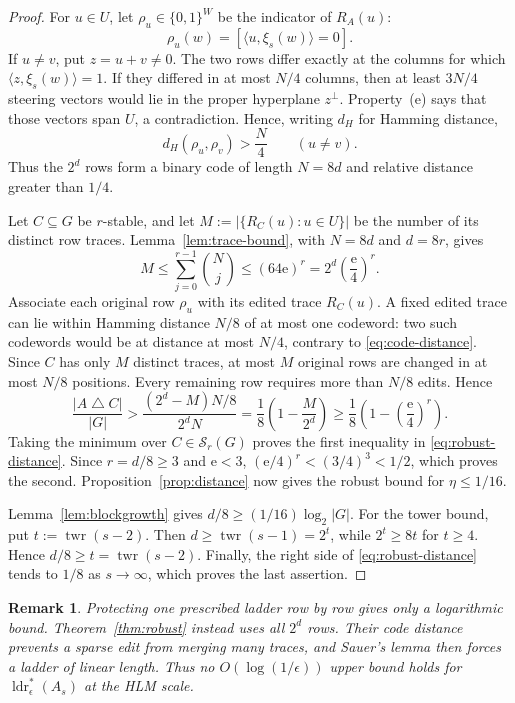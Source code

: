 \documentclass[10pt,a4paper]{amsart}
\newtheorem{remark}[theorem]{Remark}
\numberwithin{theorem}{section}
\newcommand{\inner}[2]{\langle #1,#2\rangle}
\newcommand{\abs}[1]{\lvert #1\rvert}
\newcommand{\twr}{\operatorname{twr}}
\newcommand{\ldrs}{\operatorname{ldr}^{*}}
\newcommand{\Stable}{\mathcal{S}}
\newcommand{\econst}{\mathrm e}
\begin{document}
\begin{proof}
For $u\in U$, let $\rho_u\in\{0,1\}^{W}$ be the indicator of $R_A(u)$:
\[
  \rho_u(w)=[\inner{u}{\xi_s(w)}=0].
\]
If $u\ne v$, put $z=u+v\ne0$.  The two rows differ exactly at the columns
for which $\inner{z}{\xi_s(w)}=1$.  If they differed in at most $N/4$
columns, then at least $3N/4$ steering vectors would lie in the proper
hyperplane $z^\perp$.  Property~\textup{(e)} says that those vectors span
$U$, a contradiction.  Hence, writing $d_H$ for Hamming distance,
\begin{equation}\label{eq:code-distance}
  d_H(\rho_u,\rho_v)>\frac N4\qquad(u\ne v).
\end{equation}
Thus the $2^d$ rows form a binary code of length $N=8d$ and relative
distance greater than $1/4$.

Let $C\subseteq G$ be $r$-stable, and let
$M:=\abs{\{R_C(u):u\in U\}}$ be the number of its distinct row traces.
Lemma~\ref{lem:trace-bound}, with $N=8d$ and $d=8r$, gives
\begin{equation}\label{eq:stable-traces}
  M\le\sum_{j=0}^{r-1}\binom Nj
  \le(64\econst)^r
  =2^d\left(\frac{\econst}{4}\right)^r.
\end{equation}
Associate each original row $\rho_u$ with its edited trace $R_C(u)$.  A fixed
edited trace can lie within Hamming distance $N/8$ of at most one codeword:
two such codewords would be at distance at most $N/4$, contrary to
\eqref{eq:code-distance}.  Since $C$ has only $M$ distinct traces, at most
$M$ original rows are changed in at most $N/8$ positions.  Every remaining
row requires more than $N/8$ edits.  Hence
\[
  \frac{\abs{A\mathbin\triangle C}}{\abs G}
  >\frac{(2^d-M)N/8}{2^dN}
  =\frac18\left(1-\frac{M}{2^d}\right)
  \ge\frac18\left(1-\left(\frac{\econst}{4}\right)^r\right).
\]
Taking the minimum over $C\in\Stable_r(G)$ proves the first inequality in
\eqref{eq:robust-distance}.  Since $r=d/8\ge3$ and $\econst<3$,
$(\econst/4)^r<(3/4)^3<1/2$, which proves the second.
Proposition~\ref{prop:distance} now gives the robust bound for
$\eta\le1/16$.

Lemma~\ref{lem:blockgrowth} gives
$d/8\ge(1/16)\log_2\abs G$.  For the tower bound, put
$t:=\twr(s-2)$.  Then $d\ge\twr(s-1)=2^t$, while $2^t\ge8t$ for
$t\ge4$.  Hence $d/8\ge t=\twr(s-2)$.  Finally, the right side of
\eqref{eq:robust-distance} tends to $1/8$ as $s\to\infty$, which proves the
last assertion.
\end{proof}

\begin{remark}\label{rem:log-false}
Protecting one prescribed ladder row by row gives only a logarithmic bound.
Theorem~\ref{thm:robust} instead uses all $2^d$ rows.  Their code distance
prevents a sparse edit from merging many traces, and Sauer's lemma then
forces a ladder of linear length.  Thus no
$O(\log(1/\epsilon))$ upper bound holds for
$\ldrs_\epsilon(A_s)$ at the HLM scale.
\end{remark}
\end{document}
